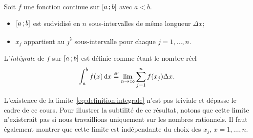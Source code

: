 \documentclass[main.tex]{subfiles}
\begin{document}
\begin{definition}

    Soit $f$ une fonction continue sur $\mathopen{[}a\,;b\mathclose{]}$ avec $a < b$.

    \begin{itemize}
        \item $\mathopen{[}a\,;b\mathclose{]}$ est sudvidisé en $n$ sous-intervalles de même longueur $\Delta x$;
        \item $x_j$ appartient au $j$\textsuperscript{è} sous-intervalle pour chaque $j = 1, \dots, n$.
    \end{itemize}

    L'\emph{intégrale} de $f$ sur $\mathopen{[}a\,;b\mathclose{]}$ est définie comme étant le nombre réel
    \begin{align}
        \int_a^b f(x) \dd x \defeq \lim_{n \to \infty} \sum_{j = 1}^n f(x_j) \Delta x.
        \label{eq:definition:integrale}
    \end{align}
\end{definition}

\begin{remark}

    L'existence de la limite~\eqref{eq:definition:integrale} n'est pas triviale et dépasse le cadre de ce cours.
    Pour illustrer la subtilité de ce résultat,
    notons que cette limite n'existerait pas si nous travaillions uniquement sur les nombres rationnels.
    Il faut également montrer que cette limite est indépendante du choix des $x_j$, $x = 1, \dots, n$.
\end{remark}
\end{document}
